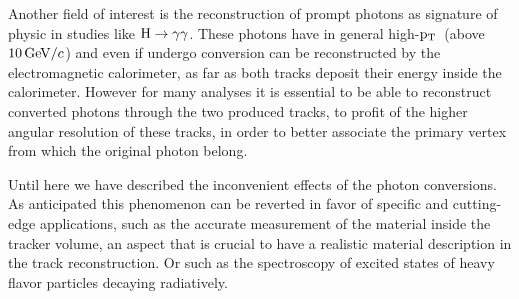 \documentclass[a4paper]{jpconf}
\def \pt{$\p_{\rm T}$~}
\begin{document}
Another field of interest is the reconstruction of prompt photons as signature of  physic in studies like $\rm H \to \gamma \gamma$.
These photons  have in general high-\pt (above $10{\rm \, GeV}/c$) and even if undergo conversion can be reconstructed by the electromagnetic calorimeter, as far as both tracks deposit their energy inside the calorimeter.
However for many analyses it is essential to be able to reconstruct  converted photons through the two produced tracks, to profit of the higher angular resolution of these tracks, in order to  better associate the primary vertex from which the original photon belong.  

Until here we have described the inconvenient effects of the photon conversions. As anticipated this phenomenon can be reverted in favor of specific and cutting-edge applications, such as the accurate measurement of the material inside the tracker volume, an aspect that is crucial to have a realistic  material description in the track reconstruction. Or such as the spectroscopy of excited states of heavy flavor particles decaying radiatively. 
\end{document}
